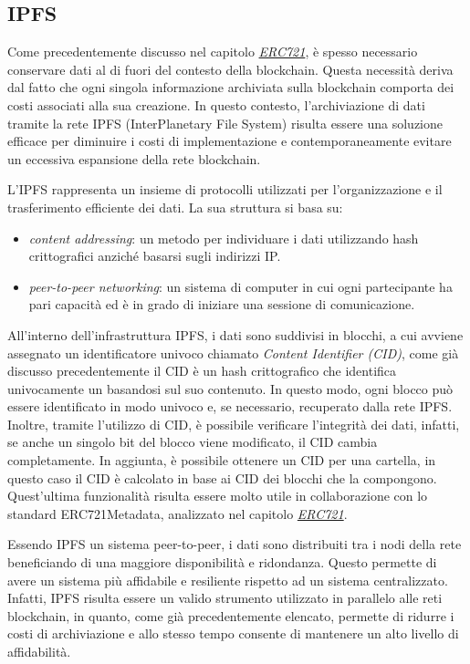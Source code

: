 \subsection{IPFS}
\label{sec:ipfs}
Come precedentemente discusso nel capitolo \hyperref[sec:erc721]{\textit{ERC721}}, è spesso necessario conservare dati al di fuori del contesto della blockchain. Questa necessità deriva dal fatto che ogni singola informazione archiviata sulla blockchain comporta dei costi associati alla sua creazione. In questo contesto, l'archiviazione di dati tramite la rete IPFS (InterPlanetary File System) risulta essere una soluzione efficace per diminuire i costi di implementazione e contemporaneamente evitare un eccessiva espansione della rete blockchain.

L'IPFS rappresenta un insieme di protocolli utilizzati per l'organizzazione e il trasferimento efficiente dei dati. La sua struttura si basa su:
\begin{itemize}
    \item \textit{content addressing}: un metodo per individuare i dati utilizzando hash crittografici anziché basarsi sugli indirizzi IP.
    \item \textit{peer-to-peer networking}: un sistema di computer in cui ogni partecipante ha pari capacità ed è in grado di iniziare una sessione di comunicazione.
\end{itemize}

All'interno dell'infrastruttura IPFS, i dati sono suddivisi in blocchi, a cui avviene assegnato un identificatore univoco chiamato \textit{Content Identifier (CID)}, come già discusso precedentemente il CID è un hash crittografico che identifica univocamente un basandosi sul suo contenuto. In questo modo, ogni blocco può essere identificato in modo univoco e, se necessario, recuperato dalla rete IPFS. Inoltre, tramite l'utilizzo di CID, è possibile verificare l'integrità dei dati, infatti, se anche un singolo bit del blocco viene modificato, il CID cambia completamente. In aggiunta, è possibile ottenere un CID per una cartella, in questo caso il CID è calcolato in base ai CID dei blocchi che la compongono. Quest'ultima funzionalità risulta essere molto utile in collaborazione con lo standard ERC721Metadata, analizzato nel capitolo \hyperref[sec:erc721]{\textit{ERC721}}. \cite{ipfs}

Essendo IPFS un sistema peer-to-peer, i dati sono distribuiti tra i nodi della rete beneficiando di una maggiore disponibilità e ridondanza. Questo permette di avere un sistema più affidabile e resiliente rispetto ad un sistema centralizzato. Infatti, IPFS risulta essere un valido strumento utilizzato in parallelo alle reti blockchain, in quanto, come già precedentemente elencato, permette di ridurre i costi di archiviazione e allo stesso tempo consente di mantenere un alto livello di affidabilità. \cite{ipfs}